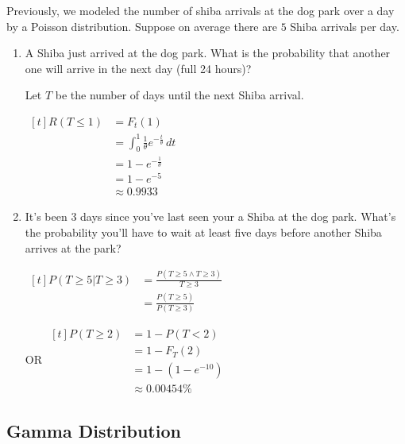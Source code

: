 \begin{example}
    Previously, we modeled the number of shiba arrivals at the dog park over a day by a Poisson distribution. Suppose on average there are $5$ Shiba arrivals per day.

    \begin{enumerate}[label=\alph*)]
        \item A Shiba just arrived at the dog park. What is the probability that another one will arrive in the next day (full 24 hours)?
        
        Let $T$ be the number of days until the next Shiba arrival. 

        $\begin{aligned}[t]
            R(T \le 1) & = F_t(1)                                               \\
                       & = \int_0^1 \frac{1}{\theta} e^{-\frac{t}{\theta}} \,dt \\
                       & = 1 - e^{-\frac{1}{\theta}}                            \\
                       & = 1 - e^{-5}                                           \\
                       & \approx 0.9933
        \end{aligned}$

        \item It's been 3 days since you've last seen your a Shiba at the dog park. What's the probability you'll have to wait at least five days before another Shiba arrives at the park?
        
        $\begin{aligned}[t]
            P(T \ge 5 | T \ge 3) & = \frac{P(T \ge 5 \land T \ge 3)}{T \ge 3} \\
                                 & = \frac{P(T \ge 5)}{P(T \ge 3)}
        \end{aligned}$

        OR $\begin{aligned}[t]
            P(T \ge 2) & = 1 - P(T < 2) \\
            & = 1 - F_T(2) \\
            & = 1 - (1 - e^{-10}) \\
            & \approx 0.00454\%
        \end{aligned}$
    \end{enumerate}
\end{example}

\subsection{Gamma Distribution}

